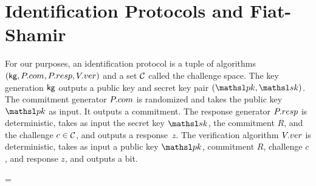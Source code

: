 \section{Identification Protocols and Fiat-Shamir}
\label{sec:idprots}


For our purposes, an identification protocol is a tuple of algorithms
$(\textsf{kg},P.com,P.resp,V.ver)$ and a set ${\cal C}$ called the challenge space. 
The key generation $\textsf{kg}$ outputs a public key and secret key pair
$(\pk,\sk)$. The commitment generator $P.com$ is randomized and takes the
public key $\pk$ as input. It outputs a commitment. The response generator $P.resp$ is
deterministic, takes as input the secret key $\sk$, the commitment $R$, and the
challenge $c \in {\cal C}$, and outputs a response~$z$. The verification
algorithm $V.ver$ is deterministic, takes as input a public key $\pk$, 
commitment $R$, challenge $c$, and response $z$, and outputs a bit.  

\bnm
{} = 
\enm



